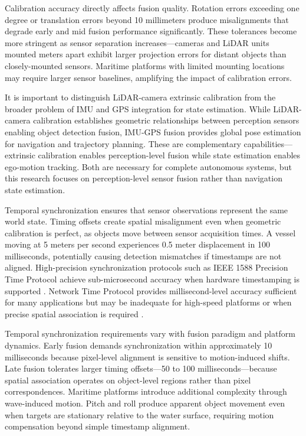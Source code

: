 \documentclass[../main.tex]{subfiles}
\begin{document}
Calibration accuracy directly affects fusion quality. Rotation errors exceeding one degree or translation errors beyond 10 millimeters produce misalignments that degrade early and mid fusion performance significantly. These tolerances become more stringent as sensor separation increases—cameras and LiDAR units mounted meters apart exhibit larger projection errors for distant objects than closely-mounted sensors. Maritime platforms with limited mounting locations may require larger sensor baselines, amplifying the impact of calibration errors.

It is important to distinguish LiDAR-camera extrinsic calibration from the broader problem of IMU and GPS integration for state estimation. While LiDAR-camera calibration establishes geometric relationships between perception sensors enabling object detection fusion, IMU-GPS fusion provides global pose estimation for navigation and trajectory planning. These are complementary capabilities—extrinsic calibration enables perception-level fusion while state estimation enables ego-motion tracking. Both are necessary for complete autonomous systems, but this research focuses on perception-level sensor fusion rather than navigation state estimation.

Temporal synchronization ensures that sensor observations represent the same world state. Timing offsets create spatial misalignment even when geometric calibration is perfect, as objects move between sensor acquisition times. A vessel moving at 5 meters per second experiences 0.5 meter displacement in 100 milliseconds, potentially causing detection mismatches if timestamps are not aligned. High-precision synchronization protocols such as IEEE 1588 Precision Time Protocol achieve sub-microsecond accuracy when hardware timestamping is supported \cite{ptp2008}. Network Time Protocol provides millisecond-level accuracy sufficient for many applications but may be inadequate for high-speed platforms or when precise spatial association is required \cite{furgale2013, liu2021}.

Temporal synchronization requirements vary with fusion paradigm and platform dynamics. Early fusion demands synchronization within approximately 10 milliseconds because pixel-level alignment is sensitive to motion-induced shifts. Late fusion tolerates larger timing offsets—50 to 100 milliseconds—because spatial association operates on object-level regions rather than pixel correspondences. Maritime platforms introduce additional complexity through wave-induced motion. Pitch and roll produce apparent object movement even when targets are stationary relative to the water surface, requiring motion compensation beyond simple timestamp alignment.
\end{document}

